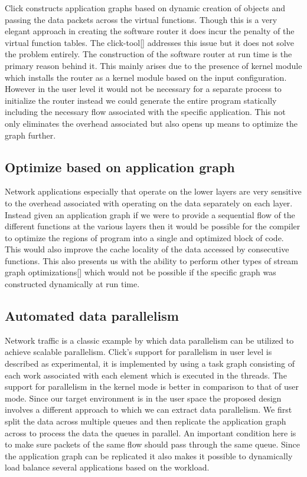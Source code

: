 \documentclass[conference]{IEEEtran}
\begin{document}
Click constructs application graphs based on dynamic creation of objects and passing the data packets across the virtual functions. Though this is a very elegant approach in creating the software router it does incur the penalty of the virtual function tables. The click-tool[] addresses this issue but it does not solve the problem entirely. The construction of the software router at run time is the primary reason behind it. This mainly arises due to the presence of kernel module which installs the router as a kernel module based on the input configuration. However in the user level it would not be necessary for a separate process to initialize the router instead we could generate the entire program statically including the necessary flow associated with the specific application. This not only eliminates the overhead associated but also opens up means to optimize the graph further. 

\subsection{Optimize based on application graph}

Network applications especially that operate on the lower layers are very sensitive to the overhead associated with operating on the data separately on each layer. Instead given an application graph if we were to provide a sequential flow of the different functions at the various layers then it would be possible for the compiler to optimize the regions of program into a single and optimized block of code. This would also improve the cache locality of the data accessed by consecutive functions. This also presents us with the ability to perform other types of stream graph optimizations[] which would not be possible if the specific graph was constructed dynamically at run time.

\subsection{Automated data parallelism}

Network traffic is a classic example by which data parallelism can be utilized to achieve scalable parallelism. Click's support for parallelism in user level is described as experimental, it is implemented by using a task graph consisting of each work associated with each element which is executed in the threads. The support for parallelism in the kernel mode is better in comparison to that of user mode. Since our target environment is in the user space the proposed design involves a different approach to which we can extract data parallelism. We first split the data across multiple queues and then replicate the application graph across to process the data the queues in parallel. An important condition here is to make sure packets of the same flow should pass through the same queue. Since the application graph can be replicated it also makes it possible to dynamically load balance several applications based on the workload.   
\end{document}
